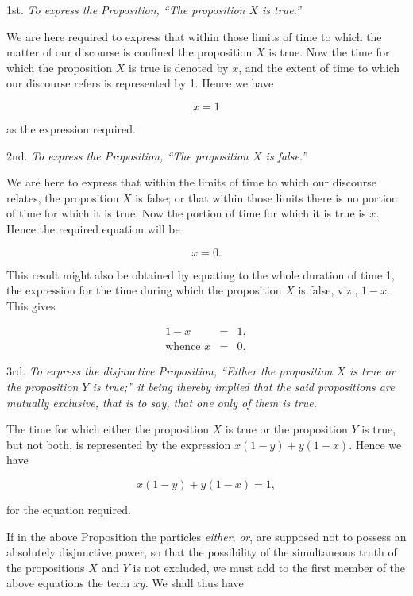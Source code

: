 \documentclass[oneside]{book}
\begin{document}
1st. \textit{To express the Proposition, ``The proposition $X$ is true.''}

We are here required to express that within those limits of
time to which the matter of our discourse is confined the
proposition $X$ is true. Now the time for which the proposition $X$ is
true is denoted by $x$, and the extent of time to which our
discourse refers is represented by 1. Hence we have

\begin{equation}
x=1
\end{equation}

as the expression required.

2nd. \textit{To express the Proposition, ``The proposition $X$ is
false.''}

We are here to express that within the limits of time to which
our discourse relates, the proposition $X$ is false; or that within
those limits there is no portion of time for which it is true. Now
the portion of time for which it is true is $x$. Hence the required
equation will be

\begin{equation}
x = 0.
\end{equation}

This result might also be obtained by equating to the whole
duration of time 1, the expression for the time during which the
proposition $X$ is false, viz., $1-x$. This gives

\begin{eqnarray*}
1-x&=& 1, \\
\textrm{whence } x &=& 0.
\end{eqnarray*}

3rd. \textit{To express the disjunctive Proposition, ``Either the proposition
$X$ is true or the proposition $Y$ is true;'' it being thereby
implied that the said propositions are mutually exclusive, that is to
say, that one only of them is true.}

The time for which either the proposition $X$ is true or the
proposition $Y$ is true, but not both, is represented by the
expression $x(1-y) + y(1-x)$. Hence we have

\begin{equation}
x(1-y) + y(1-x) = 1,
\end{equation}

for the equation required.

If in the above Proposition the particles \textit{either}, \textit{or}, are
supposed not to possess an absolutely disjunctive power, so that the
possibility of the simultaneous truth of the propositions $X$ and $Y$
is not excluded, we must add to the first member of the above
equations the term $xy$. We shall thus have
\end{document}

